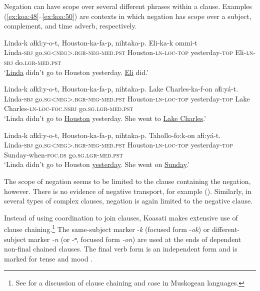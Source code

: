 \documentclass[output=paper,colorlinks,citecolor=brown]{langscibook}
\begin{document}
Negation can have scope over several different phrases within a clause. Examples (\ref{ex:koa:48}--\ref{ex:koa:50}) are contexts in which negation has scope over a subject, complement, and time adverb, respectively.

\ea\label{ex:koa:48}
    \gll Linda-k  aɬkǐ:y-o-t, Houston-ka-fa-p,  nihtaka-p. Eli-ka-k  ommi-t \\
         Linda-\textsc{sbj}  go.\textsc{sg}<\textsc{neg}>.\textsc{rgr}-\textsc{neg}-\textsc{med.pst} Houston-\textsc{ln}-\textsc{loc}-\textsc{top}  yesterday-\textsc{top} Eli-\textsc{ln}-\textsc{sbj}  do.\textsc{lgr}-\textsc{med.pst}\\
    \glt ‘\uline{Linda} didn’t go to Houston yesterday. \uline{Eli} did.’
\z 

\ea\label{ex:koa:49}
    \gll Linda-k  aɬkǐ:y-o-t, Houston-ka-fa-p,  nihtaka-p. Lake Charles-ka-f-on  aɬì:yá-t. \\ 
         Linda-\textsc{sbj}  go.\textsc{sg}<\textsc{neg}>.\textsc{rgr}-\textsc{neg}-\textsc{med.pst} Houston-\textsc{ln}-\textsc{loc}-\textsc{top}  yesterday-\textsc{top} Lake Charles-\textsc{ln}-\textsc{loc}-\textsc{foc}.\textsc{nsbj}  go.\textsc{sg}.\textsc{lgr}-\textsc{med.pst}\\
    \glt  ‘Linda didn’t go to \uline{Houston} yesterday. She went to \uline{Lake Charles}.’
\z 

\ea\label{ex:koa:50}
    \gll Linda-k  aɬkǐ:y-o-t, Houston-ka-fa-p,  nihtaka-p. Tahollo-fo:k-on  aɬì:yá-t. \\ 
         Linda-\textsc{sbj}  go.\textsc{sg}<\textsc{neg}>.\textsc{rgr}-\textsc{neg}-\textsc{med.pst} Houston-\textsc{ln}-\textsc{loc}-\textsc{top}  yesterday-\textsc{top} Sunday-when-\textsc{foc}.\textsc{ds}  go.\textsc{sg}.\textsc{lgr}-\textsc{med.pst}\\
    \glt ‘Linda didn’t go to Houston \uline{yesterday}. She went on \uline{Sunday}.’
\z 

The scope of negation seems to be limited to the clause containing the negation, however. There is no evidence of negative transport, for example (). Similarly, in several types of complex clauses, negation is again limited to the negative clause.

Instead of using coordination to join clauses, Koasati makes extensive use of clause chaining.\footnote{See \citet{Martin2024} for a discussion of clause chaining and case in Muskogean languages.}
The same-subject marker -\textit{k} (focused form -\textit{ok}) or different-subject marker \textit{-n} (or -\textit{ⁿ}, focused form \textit{-on}) are used at the ends of dependent non-final chained clauses. The final verb form is an independent form and is marked for tense and mood .
\end{document}
